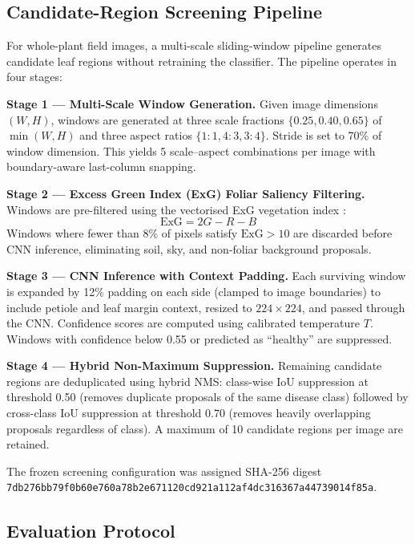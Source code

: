 \documentclass[pdflatex,sn-mathphys-num]{sn-jnl}
\begin{document}
\subsection{Candidate-Region Screening Pipeline}
\label{sec:screening_pipeline}

For whole-plant field images, a multi-scale sliding-window pipeline generates candidate
leaf regions without retraining the classifier. The pipeline operates in four stages:

\textbf{Stage 1 — Multi-Scale Window Generation.}
Given image dimensions $(W, H)$, windows are generated at three scale fractions
$\{0.25, 0.40, 0.65\}$ of $\min(W, H)$ and three aspect ratios $\{1{:}1, 4{:}3, 3{:}4\}$.
Stride is set to 70\% of window dimension. This yields 5 scale--aspect combinations per
image with boundary-aware last-column snapping.

\textbf{Stage 2 — Excess Green Index (ExG) Foliar Saliency Filtering.}
Windows are pre-filtered using the vectorised ExG vegetation index
\citep{woebbecke1995color}:
\begin{equation}
  \text{ExG} = 2G - R - B
  \label{eq:exg}
\end{equation}
Windows where fewer than 8\% of pixels satisfy $\text{ExG} > 10$ are discarded before
CNN inference, eliminating soil, sky, and non-foliar background proposals.

\textbf{Stage 3 — CNN Inference with Context Padding.}
Each surviving window is expanded by 12\% padding on each side (clamped to image
boundaries) to include petiole and leaf margin context, resized to $224 \times 224$,
and passed through the CNN. Confidence scores are computed using calibrated temperature
$T$. Windows with confidence below 0.55 or predicted as ``healthy'' are suppressed.

\textbf{Stage 4 — Hybrid Non-Maximum Suppression.}
Remaining candidate regions are deduplicated using hybrid NMS: class-wise IoU
suppression at threshold 0.50 (removes duplicate proposals of the same disease class)
followed by cross-class IoU suppression at threshold 0.70 (removes heavily overlapping
proposals regardless of class). A maximum of 10 candidate regions per image are retained.

The frozen screening configuration was assigned SHA-256 digest
\texttt{7db276bb79f0b60e760a78b2e671120cd921a112af4dc316367a44739014f85a}.

\subsection{Evaluation Protocol}
\label{sec:eval_protocol}
\end{document}
